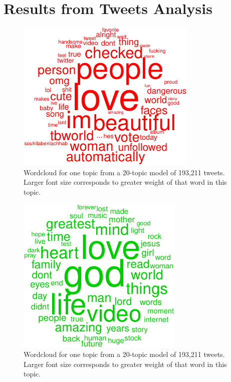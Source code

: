 \documentclass[12pt,]{article}
\begin{document}
\section{Results from Tweets
Analysis}\label{results-from-tweets-analysis}

\begin{figure}
\includegraphics[width=\textwidth]{lda-tutorial-2016_files/figure-latex/tw-wordcloud1-5.pdf}
\caption{Wordcloud for one topic from a 20-topic model of 193,211 tweets. Larger font size corresponds to greater weight of that word in this topic.\label{fig:twc1}}
\end{figure}

\begin{figure}
\includegraphics[width=\textwidth]{lda-tutorial-2016_files/figure-latex/tw-wordcloud1-2.pdf}
\caption{Wordcloud for one topic from a 20-topic model of 193,211 tweets. Larger font size corresponds to greater weight of that word in this topic.\label{fig:twc2}}
\end{figure}
\end{document}
